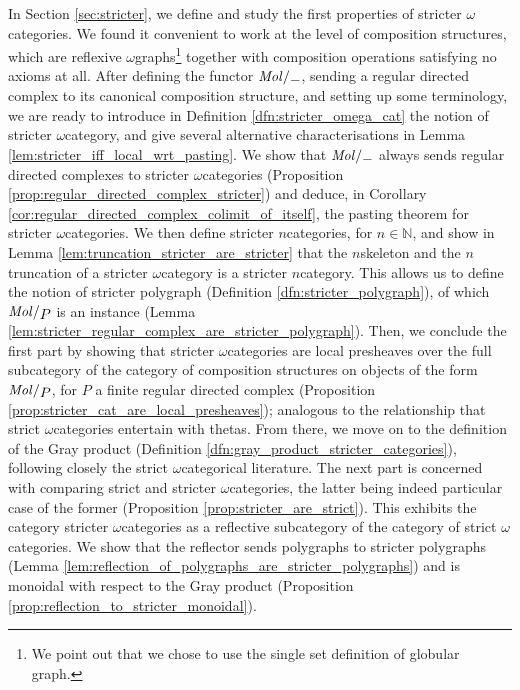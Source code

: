 In Section \ref{sec:stricter}, we define and study the first properties of stricter \( \omega \)\nbd categories.
We found it convenient to work at the level of composition structures, which are reflexive \( \omega \)\nbd graphs\footnote{We point out that we chose to use the single set definition of globular graph.} together with composition operations satisfying no axioms at all.
After defining the functor \( \molecin{-} \), sending a regular directed complex to its canonical composition structure, and setting up some terminology, we are ready to introduce in Definition \ref{dfn:stricter_omega_cat} the notion of stricter \( \omega \)\nbd category, and give several alternative characterisations in Lemma \ref{lem:stricter_iff_local_wrt_pasting}.
We show that \( \molecin{-} \) always sends regular directed complexes to stricter \( \omega \)\nbd categories (Proposition \ref{prop:regular_directed_complex_stricter}) and deduce, in Corollary \ref{cor:regular_directed_complex_colimit_of_itself}, the pasting theorem for stricter \( \omega \)\nbd categories.
We then define stricter \( n \)\nbd categories, for \( n \in \mathbb{N} \), and show in Lemma \ref{lem:truncation_stricter_are_stricter} that the \( n \)\nbd skeleton and the \( n \)\nbd truncation of a stricter \( \omega \)\nbd category is a stricter \( n \)\nbd category.
This allows us to define the notion of stricter polygraph (Definition \ref{dfn:stricter_polygraph}), of which \( \molecin{P} \) is an instance (Lemma \ref{lem:stricter_regular_complex_are_stricter_polygraph}).
Then, we conclude the first part by showing that stricter \( \omega \)\nbd categories are local presheaves over the full subcategory of the category of composition structures on objects of the form \( \molecin{P} \), for \( P \) a finite regular directed complex (Proposition \ref{prop:stricter_cat_are_local_presheaves}); analogous to the relationship that strict \( \omega \)\nbd categories entertain with thetas.
From there, we move on to the definition of the Gray product (Definition \ref{dfn:gray_product_stricter_categories}), following closely the strict \( \omega \)\nbd categorical literature.
The next part is concerned with comparing strict and stricter \( \omega \)\nbd categories, the latter being indeed particular case of the former (Proposition \ref{prop:stricter_are_strict}).
This exhibits the category stricter \( \omega \)\nbd categories as a reflective subcategory of the category of strict \( \omega \)\nbd categories.
We show that the reflector sends polygraphs to stricter polygraphs (Lemma \ref{lem:reflection_of_polygraphs_are_stricter_polygraphs}) and is monoidal with respect to the Gray product (Proposition \ref{prop:reflection_to_stricter_monoidal}).
